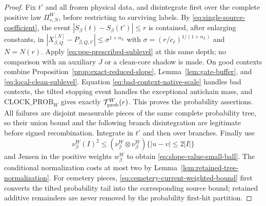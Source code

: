 \documentclass[11pt]{article}
\begin{document}
\begin{proof}
Fix $t'$ and all frozen physical data, and disintegrate first over the
complete positive law $\Pi_{s,N}^{W}$, before restricting to surviving
labels.  By
\eqref{eq:single-source-coefficient}, the event
$|S_\beta(t)-S_\beta(t')|\le r$ is contained, after enlarging constants, in
 $|X^{[N]}_{\beta,Q}-P_{\beta,Q,t'}|\le\sigma^{1+\alpha_L}$ with
$\sigma=(r/c_\ell)^{1/(1+\alpha_L)}$ and $N=N(r)$.  Apply
\eqref{eq:ppe-prescribed-sublevel} at this same depth; no comparison with an
auxiliary $J$ or a clean-core shadow is made.  On good contexts combine
Proposition~\ref{prop:exact-reduced-slope}, Lemma~\ref{lem:gate-buffer}, and
\eqref{eq:local-clean-sublevel}.  Equation \eqref{eq:bad-context-native-scale}
handles bad contexts, the tilted stopping event handles the exceptional
antichain mass, and $\mathrm{CLOCK\_PROB}_{W}$ gives exactly
$\mathcal T_{\rm prob}^{W}(r)$.  This proves the probability assertions.  All
failures are disjoint measurable pieces of the
same complete probability tree, so their union bound and the following
branch disintegration are legitimate before signed recombination.  Integrate
in $t'$ and then over branches.  Finally use
\[
 \nu_\beta^{W}(I)^2\le
 (\nu_\beta^{W}\otimes\nu_\beta^{W})\{|u-v|\le2|I|\}
\]
and Jensen in the positive weights $w_\beta^{W}$ to obtain
\eqref{eq:slope-value-small-ball}.
The conditional normalization costs at most two by
Lemma~\ref{lem:retained-tree-normalization}.  For cemetery pieces,
\eqref{eq:cemetery-current-weighted-bound} first converts the tilted
probability tail into the corresponding source bound; retained additive
remainders are never removed by the probability first-hit partition.
\end{proof}
\end{document}
